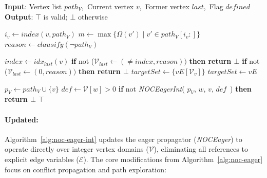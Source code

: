 \documentclass[a4paper,fleqn]{cas-sc}
\begin{document}
\begin{algorithm}[htb]
\small
\caption{\textbf{\textit{NOCEagerInt}}}
\textbf{Input}: Vertex list $path_V$,\ Current vertex $v$,\ Former vertex $\textit{last}$,\ Flag $\textit{defined}$ \\
\textbf{Output}: $\top$ is valid; $\bot$ otherwise
\begin{algorithmic}[1]
     \label{alg:noc-eager-int:pathcheck}
        \STATE $i_v \gets \textit{index}(v, path_V)$
        \STATE $m \gets \max\{\Omega(v') \mid v' \in path_V[i_v:]\}$
         \label{alg:noc-eager-int:checkopponent}
            \STATE $\textit{reason} \gets \textit{clausify}(\neg path_V)$ \label{alg:noc-eager-int:reason}

             \label{alg:noc-eager-int:filtering}
            \STATE $index \gets \textit{idx}_{\textit{last}}(v)$
            \STATE \textbf{if }not ($\mathcal{V}_{\textit{last}} \gets (\neq index, \textit{reason}))$ \textbf{then return $\bot$} \label{alg:noc-eager-int:filtering-player}
            \ELSE
                \STATE \textbf{if }not ($\mathcal{V}_{\textit{last}} \gets (0, \textit{reason}))$ \textbf{then return $\bot$} \label{alg:noc-eager-int:filtering-opponent}
            \ENDIF
        \ENDIF
     \label{alg:noc-eager-int:defcheck}
            \STATE $\textit{targetSet} \gets \{vE[\mathcal{V}_v]\}$ \label{alg:noc-eager-int:traversal-player}
        \ELSE
            \STATE $\textit{targetSet} \gets vE$ \label{alg:noc-eager-int:traversal-opponent}
        \ENDIF

         \label{alg:noc-eager-int:edgecheck}
            \STATE $p_V \gets path_V \cup \{v\}$
            \STATE $\textit{def} \gets \mathcal{V}[w] > 0$ \label{alg:noc-eager-int:def}
            \STATE \textbf{if }not \textit{NOCEagerInt}(
                $p_V$,
                $w$,
                $v$,
                $\textit{def}$\ ) \textbf{then return $\bot$}
        \ENDFOR
    \ENDIF
    \RETURN $\top$
\end{algorithmic}
\label{alg:noc-eager-int}
\end{algorithm}

\paragraph{\nooppc Updated:}

Algorithm~\ref{alg:noc-eager-int} updates the eager propagator (\textit{NOCEager}) to operate directly over integer vertex domains ($\mathcal{V}$), eliminating all references to explicit edge variables ($\mathcal{E}$). The core modifications from Algorithm~\ref{alg:noc-eager} focus on conflict propagation and path exploration:
\end{document}
